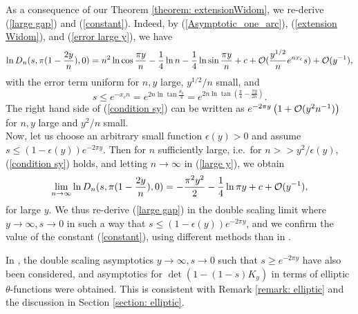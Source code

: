 \documentclass[11pt,fleqn]{article}
\numberwithin{equation}{section}
\def\bigO{{\cal O}}
\begin{document}
As a consequence of our Theorem \ref{theorem: extensionWidom}, we re-derive (\ref{large gap}) and (\ref{constant}).
Indeed,
by (\ref{Asymptotic_one_arc}), (\ref{extension Widom}), and (\ref{error large y}), we have 
\begin{equation}\label{large y}
\ln D_n(s,\pi(1-\frac{2y}{n}),0)=n^2\ln\cos\frac{\pi y}{n}-\frac{1}{4}\ln n-\frac{1}{4}\ln\sin\frac{\pi y}{n}+c+\bigO(\frac{y^{1/2}}{n}e^{nx_{c}}s)+ \bigO(y^{-1}),
\end{equation}
with the error term uniform for $n,y$ large, $y^{1/2}/n$ small, and 
\begin{equation}\label{condition sy}s\leq e^{-x_cn}=e^{2n\ln\tan\frac{\theta_0}{4}}=e^{2n\ln\tan\left(\frac{\pi}{4}-\frac{\pi y}{2n}\right)}.\end{equation}
The right hand side of (\ref{condition sy}) can be written as $e^{-2\pi y}\left(1+\bigO(y^2 n^{-1})\right)$ for $n,y$ large and $y^{2}/n$ small. \\
Now, let us choose an arbitrary small function $\epsilon (y) > 0$ and assume $s \leq (1-\epsilon(y))e^{-2\pi y}$. Then for $n$ sufficiently large, i.e.\ for $n>>y^2/\epsilon(y)$, (\ref{condition sy}) holds, and letting $n\to\infty$ in (\ref{large y}), we obtain  
\begin{equation}
\lim_{n\to\infty}\ln D_n(s,\pi(1-\frac{2y}{n}),0)=-\frac{\pi^{2}y^2}{2}-\frac{1}{4}\ln \pi y+c+\bigO(y^{-1}),
\end{equation}
for large $y$.
We thus re-derive (\ref{large gap}) in the double scaling limit where $y\to\infty, s\to 0$ in such a way that $s\leq (1-\epsilon(y))e^{-2\pi y}$, and we confirm the value of the constant (\ref{constant}), using different methods than in \cite{BDIK}.

In \cite{BDIK}, the double scaling asymptotics $y\to\infty, s\to 0$ such that $s\geq e^{-2\pi y}$ have also been considered, and asymptotics for $\det(1-(1-s)K_y)$ in terms of elliptic $\theta$-functions were obtained. This is consistent with Remark \ref{remark: elliptic} and the discussion in Section \ref{section: elliptic}.
\end{document}
